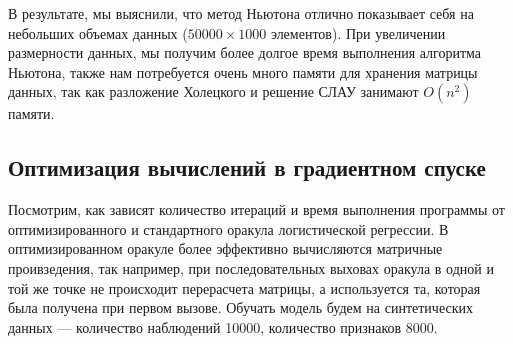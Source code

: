 \documentclass{article}
\begin{document}
	В результате, мы выяснили, что метод Ньютона отлично показывает себя на небольших объемах данных ($50000 \times 1000$ элементов). При увеличении размерности данных, мы получим более долгое время выполнения алгоритма Ньютона, также нам потребуется очень много памяти для хранения матрицы данных, так как разложение Холецкого и решение СЛАУ занимают $O(n^2)$ памяти. 
	
	\vspace{1cm}
	\subsection{Оптимизация вычислений в градиентном спуске}
	
	Посмотрим, как зависят количество итераций и время выполнения программы от оптимизированного и стандартного оракула логистической регрессии. В оптимизированном оракуле более эффективно вычисляются матричные проивзедения, так например, при последовательных выховах оракула в одной и той же точке не происходит перерасчета матрицы, а используется та, которая была получена при первом вызове. Обучать модель будем на синтетических данных --- количество наблюдений 10000, количество признаков 8000. 
	
	\newpage
	\begin{figure}[H]
		\centering
		\hfill %
		\hfill %
		\caption{}
		\label{fig:log_reg_opt}
	\end{figure}
	
\end{document}
